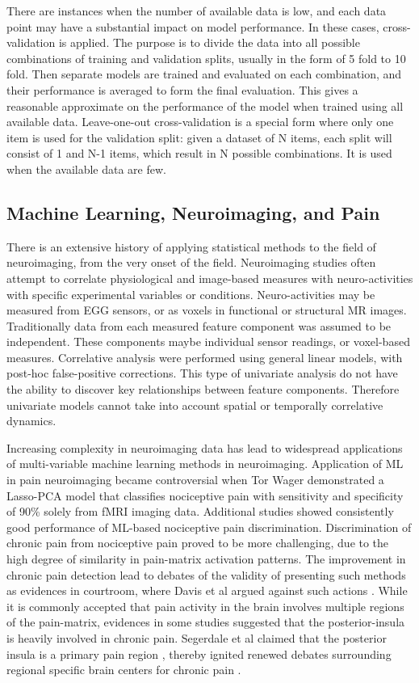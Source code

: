 There are instances when the number of available data is low, and each data point may have a substantial impact on model performance. In these cases, cross-validation is applied. The purpose is to divide the data into all possible combinations of training and validation splits, usually in the form of 5 fold to 10 fold. Then separate models are trained and evaluated on each combination, and their performance is averaged to form the final evaluation. This gives a reasonable approximate on the performance of the model when trained using all available data. Leave-one-out cross-validation is a special form where only one item is used for the validation split: given a dataset of N items, each split will consist of 1 and N-1 items, which result in N possible combinations. It is used when the available data are few. 
 
\subsection{Machine Learning, Neuroimaging, and Pain}

There is an extensive history of applying statistical methods to the field of neuroimaging, from the very onset of the field. Neuroimaging studies often attempt to correlate physiological and image-based measures with neuro-activities with specific experimental variables or conditions. Neuro-activities may be measured from EGG sensors, or as voxels in functional or structural MR images. Traditionally data from each measured feature component was assumed to be independent. These components maybe individual sensor readings, or voxel-based measures. Correlative analysis were performed using general linear models, with post-hoc false-positive corrections. This type of univariate analysis do not have the ability to discover key relationships between feature components. Therefore univariate models cannot take into account spatial or temporally correlative dynamics. 

Increasing complexity in neuroimaging data has lead to widespread applications of multi-variable machine learning methods in neuroimaging. Application of ML in pain neuroimaging became controversial when Tor Wager \cite{Wager2013} demonstrated a Lasso-PCA model that classifies nociceptive pain with sensitivity and specificity of 90\% solely from fMRI imaging data. Additional studies showed consistently good performance of ML-based nociceptive pain discrimination. Discrimination of chronic pain from nociceptive pain proved to be more challenging, due to the high degree of similarity in pain-matrix activation patterns. The improvement in chronic pain detection lead to debates of the validity of presenting such methods as evidences in courtroom, where Davis et al argued against such actions \cite{Davis2012a}. While it is commonly accepted that pain activity in the brain involves multiple regions of the pain-matrix, evidences in some studies suggested that the posterior-insula is heavily involved in chronic pain. Segerdale et al claimed that the posterior insula is a primary pain region \cite{Segerdahl2015a}, thereby ignited renewed debates surrounding regional specific brain centers for chronic pain \cite{Davis2015}.

